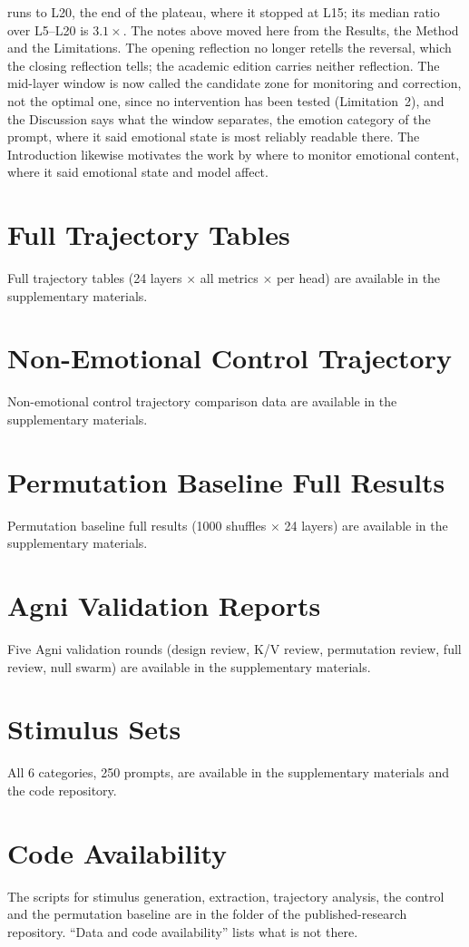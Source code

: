 \documentclass[11pt,a4paper]{article}
\begin{document}
runs to L20, the end of the plateau, where it stopped at L15; its median
ratio over L5--L20 is $3.1\times$. The notes above moved here from
the Results, the Method and the Limitations. The opening reflection no
longer retells the reversal, which the closing reflection tells; the
academic edition carries neither reflection. The mid-layer
window is now called the candidate zone for monitoring and correction,
not the optimal one, since no intervention has been tested
(Limitation~2), and the Discussion says what the window separates, the
emotion category of the prompt, where it said emotional state is most
reliably readable there. The Introduction likewise motivates the work
by where to monitor emotional content, where it said emotional state and
model affect.




\section{Full Trajectory Tables}
\label{app:trajectory}
Full trajectory tables (24 layers $\times$ all metrics $\times$ per
head) are available in the supplementary materials.

\section{Non-Emotional Control Trajectory}
\label{app:control}
Non-emotional control trajectory comparison data are available in the
supplementary materials.

\section{Permutation Baseline Full Results}
\label{app:permutation}
Permutation baseline full results (1000 shuffles $\times$ 24 layers) are
available in the supplementary materials.

\section{Agni Validation Reports}
\label{app:agni}
Five Agni validation rounds (design review, K/V review, permutation
review, full review, null swarm) are available in the supplementary
materials.

\section{Stimulus Sets}
\label{app:stimuli}
All 6 categories, 250 prompts, are available in the supplementary
materials and the code repository.

\section{Code Availability}
\label{app:code}
\sloppy
The scripts for stimulus generation, extraction, trajectory analysis,
the control and the permutation baseline are in the
 folder of the published-research
repository. ``Data and code availability'' lists what is not there.\par\fussy
\end{document}
